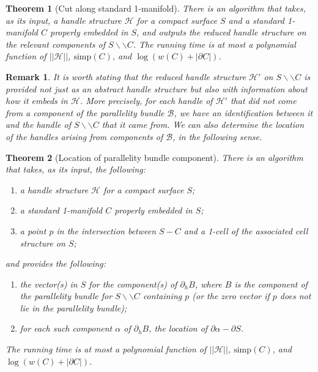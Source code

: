 \documentclass[10pt,a4paper]{amsart}
\newtheorem{theorem}{Theorem}
\newtheorem{remark}{Remark}
\newcommand{\calB}{\mathcal{B}}
\newcommand{\calH}{\mathcal{H}}
\newcommand{\cut}{\backslash\backslash}
\begin{document}
\begin{theorem}[{\sc Cut along standard 1-manifold}]
\label{Thm:CutAlong1Manifold}
There is an algorithm that takes, as its input, a handle structure $\calH$ for a compact surface $S$ and a standard 1-manifold $C$ properly embedded in $S$, and outputs the reduced handle structure on the relevant components of $S \cut C$. The running time is at most a polynomial function of $||\calH||$, $\mathrm{simp}(C)$, and $\log (w(C) + |\partial C|)$.
\end{theorem}

\begin{remark} 
\label{Rem:ReducedHSEmbeds}
It is worth stating that the reduced handle structure $\calH'$ on $S \cut C$ is provided not just as an abstract handle structure but also with information about how it embeds in $\calH$. More precisely, for each handle of $\calH'$ that did not come from a component of the parallelity bundle $\calB$, we have an identification between it and the handle of $S \cut C$ that it came from. We can also determine the location of the handles arising from components of $\calB$, in the following sense.
\end{remark}

\begin{theorem}[{\sc Location of parallelity bundle component}]
\label{Thm:LocationParBundle}
There is an algorithm that takes, as its input, the following:
\begin{enumerate}
\item a handle structure $\calH$ for a compact surface $S$;
\item a standard 1-manifold $C$ properly embedded in $S$;
\item a point $p$ in the intersection between $S - C$ and a 1-cell of the associated cell structure on $S$;
\end{enumerate} and provides the following:
\begin{enumerate}
\item the vector(s) in $S$ for the component(s) of $\partial_hB$, where $B$ is the component of the parallelity bundle for $S \cut C$ containing $p$ (or  the zero vector if $p$ does not lie in the parallelity bundle);
\item for each such component $\alpha$ of $\partial_h B$, the location of $\partial \alpha - \partial S$.
\end{enumerate}
The running time is at most a polynomial function of $||\calH||$, $\mathrm{simp}(C)$, and $\log (w(C) + |\partial C|)$.
\end{theorem}
\end{document}

